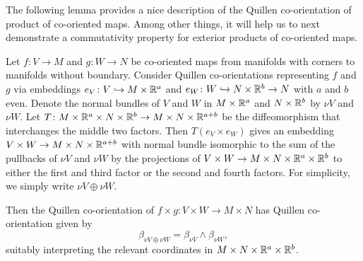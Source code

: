 The following lemma provides a nice description of the Quillen co-orientation of product of co-oriented maps.
Among other things, it will help us to next demonstrate a commutativity property for exterior products of co-oriented maps.

\begin{lemma}\label{L: Quillen product co-orientation}
	Let $f \colon V \to M$ and $g \colon W \to N$ be co-oriented maps from manifolds with corners to manifolds without boundary.
	Consider Quillen co-orientations representing $f$ and $g$ via embeddings $e_V \colon V \hookrightarrow M \times \mathbb{R}^a$ and $e_W \colon W \hookrightarrow N \times \mathbb{R}^b \to N$ with $a$ and $b$ even.
	Denote the normal bundles of $V$ and $W$ in $M \times \mathbb{R}^a$ and $N \times \mathbb{R}^b$ by $\nu V$ and $\nu W$.
	Let $T \colon M \times \mathbb{R}^a \times N \times \mathbb{R}^b \to M \times N \times \mathbb{R}^{a+b}$ be the diffeomorphism that interchanges the middle two factors.
	Then
	$T(e_V \times e_W)$ gives an embedding $V \times W \to M \times N \times \mathbb{R}^{a+b}$ with normal bundle isomorphic to the sum of the pullbacks of $\nu V$ and $\nu W$ by the projections of $V \times W \to M \times N \times \mathbb{R}^a \times \mathbb{R}^b$ to either the first and third factor or the second and fourth factors.
	For simplicity, we simply write $\nu V \oplus \nu W$.

	Then the Quillen co-orientation of $f \times g \colon V \times W \to M \times N$ has Quillen co-orientation given by $$\beta_{\nu V \oplus \nu W} = \beta_{\nu V} \wedge \beta_{\nu W},$$
	suitably interpreting the relevant coordinates in $M \times N \times \mathbb{R}^a \times \mathbb{R}^b$.
\end{lemma}

